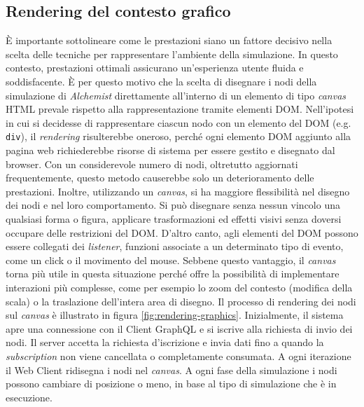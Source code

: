 \subsection{Rendering del contesto grafico}
È importante sottolineare come le prestazioni siano un fattore decisivo nella scelta delle tecniche per rappresentare l'ambiente della simulazione.
In questo contesto, prestazioni ottimali assicurano un'esperienza utente fluida e soddisfacente. È per questo motivo che la scelta di disegnare i nodi della simulazione di \textit{Alchemist} direttamente all'interno di un elemento di tipo \textit{canvas } HTML prevale rispetto alla rappresentazione tramite elementi \ac{DOM}. Nell'ipotesi in cui si decidesse di rappresentare ciascun nodo con un elemento del DOM (e.g. \texttt{div}), il \textit{rendering} risulterebbe oneroso, perché ogni elemento \ac{DOM} aggiunto alla pagina web richiederebbe risorse di sistema per essere gestito e disegnato dal browser. Con un considerevole numero di nodi, oltretutto aggiornati frequentemente, questo metodo causerebbe solo un deterioramento delle prestazioni. Inoltre, utilizzando un \textit{canvas}, si ha maggiore flessibilità nel disegno dei nodi e nel loro comportamento. Si può disegnare senza nessun vincolo una qualsiasi forma o figura, applicare trasformazioni ed effetti visivi senza doversi occupare delle restrizioni del \ac{DOM}. D'altro canto, agli elementi del \ac{DOM} possono essere collegati dei \textit{listener}, funzioni associate a un determinato tipo di evento, come un click o il movimento del mouse. Sebbene questo vantaggio, il \textit{canvas} torna più utile in questa situazione perché offre la possibilità di implementare interazioni più complesse, come per esempio lo zoom del contesto (modifica della scala) o la traslazione dell'intera area di disegno.
Il processo di rendering dei nodi sul \textit{canvas} è illustrato in figura \cref{fig:rendering-graphics}. Inizialmente, il sistema apre una connessione con il Client GraphQL e si iscrive alla richiesta di invio dei nodi. Il server accetta la richiesta d'iscrizione e invia dati fino a quando la \textit{subscription} non viene cancellata o completamente consumata. A ogni iterazione il Web Client ridisegna i nodi nel \textit{canvas}.
A ogni fase della simulazione i nodi possono cambiare di posizione o meno, in base al tipo di simulazione che è in esecuzione. 
